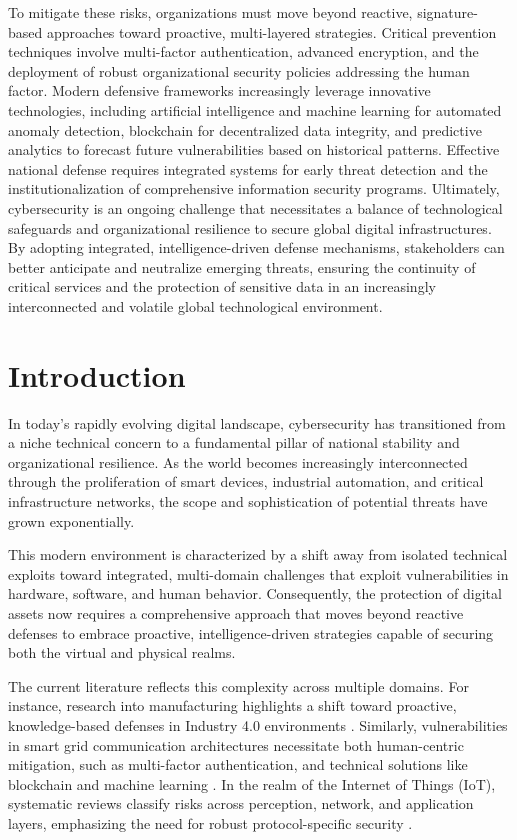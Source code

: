 \documentclass[11pt,a4paper]{article}
\begin{document}
To mitigate these risks, organizations must move beyond reactive, signature-based approaches toward proactive, multi-layered strategies. Critical prevention techniques involve multi-factor authentication, advanced encryption, and the deployment of robust organizational security policies addressing the human factor. Modern defensive frameworks increasingly leverage innovative technologies, including artificial intelligence and machine learning for automated anomaly detection, blockchain for decentralized data integrity, and predictive analytics to forecast future vulnerabilities based on historical patterns. Effective national defense requires integrated systems for early threat detection and the institutionalization of comprehensive information security programs. Ultimately, cybersecurity is an ongoing challenge that necessitates a balance of technological safeguards and organizational resilience to secure global digital infrastructures. By adopting integrated, intelligence-driven defense mechanisms, stakeholders can better anticipate and neutralize emerging threats, ensuring the continuity of critical services and the protection of sensitive data in an increasingly interconnected and volatile global technological environment.



\newpage
\section{Introduction}
In today’s rapidly evolving digital landscape, cybersecurity has transitioned from a niche technical concern to a fundamental pillar of national stability and organizational resilience. As the world becomes increasingly interconnected through the proliferation of smart devices, industrial automation, and critical infrastructure networks, the scope and sophistication of potential threats have grown exponentially. 

This modern environment is characterized by a shift away from isolated technical exploits toward integrated, multi-domain challenges that exploit vulnerabilities in hardware, software, and human behavior. Consequently, the protection of digital assets now requires a comprehensive approach that moves beyond reactive defenses to embrace proactive, intelligence-driven strategies capable of securing both the virtual and physical realms.

The current literature reflects this complexity across multiple domains. For instance, research into manufacturing highlights a shift toward proactive, knowledge-based defenses in Industry 4.0 environments \cite{b1}. Similarly, vulnerabilities in smart grid communication architectures necessitate both human-centric mitigation, such as multi-factor authentication, and technical solutions like blockchain and machine learning \cite{b2}. In the realm of the Internet of Things (IoT), systematic reviews classify risks across perception, network, and application layers, emphasizing the need for robust protocol-specific security \cite{b3, b8}. 
\end{document}
